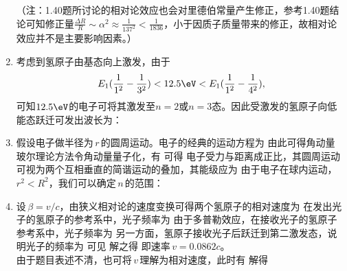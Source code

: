\begin{enumerate}[label=1.\arabic*]
（注：1.40题所讨论的相对论效应也会对里德伯常量产生修正，参考1.40题结论可知修正量$\frac{\Delta R}{R}\sim \alpha^2 
\approx\frac{1}{137^2}<\frac{1}{1836}$，小于因质子质量带来的修正，故相对论效应并不是主要影响因素。）

\item
考虑到氢原子由基态向上激发，由于
\[E_1(\frac{1}{1^2}-\frac{1}{3^2}) < 12.5\eV < E_1(\frac{1}{1^2}-\frac{1}{4^2}),\]
可知$12.5\eV$的电子可将其激发至$n=2$或$n=3$态。因此受激发的氢原子向低能态跃迁可发出波长为：

\item
假设电子做半径为$\,r\,$的圆周运动。电子的经典的运动方程为
由此可得角动量
玻尔理论方法令角动量量子化，有
可得
电子受力与距离成正比，其圆周运动可视为两个互相垂直的简谐运动的叠加，其能级应为
由于电子在球内运动，$r^2<R^2$，我们可以确定$\,n\,$的范围：

\item
设$\,\beta=v/c$，由狭义相对论的速度变换可得两个氢原子的相对速度为
在发出光子的氢原子的参考系中，光子频率为
由于多普勒效应，在接收光子的氢原子参考系中，光子频率为
另一方面，氢原子接收光子后跃迁到第二激发态，说明光子的频率为
可见
解之得
即速率$\,v=0.0862c$。\\
由于题目表述不清，也可将$\,v\,$理解为相对速度，此时有
解得


\end{enumerate}

